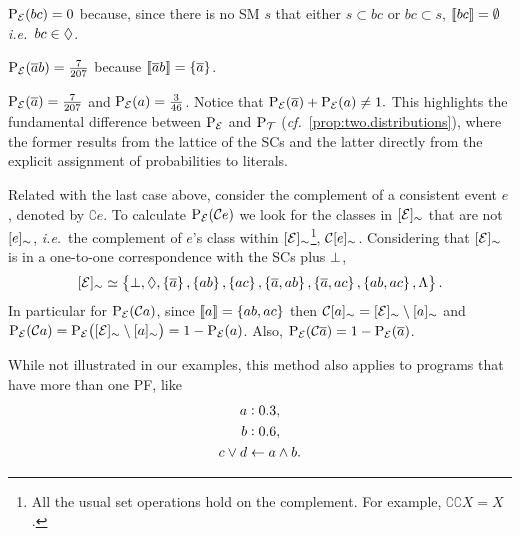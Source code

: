 \documentclass[x11names]{tlp}
\begin{document}
\begin{example}
\begin{description}
		\item $\prE\at{bc} = 0$ because, since there is no \ac{SM} $s$ that either $s \subset bc$ or $bc \subset s$, $\left\llbracket bc \right\rrbracket = \emptyset$ \emph{i.e.}\ $bc \in \Diamond$.

		\item $\prE\at{\co{a}b} = \frac{7}{207}$ because $\left\llbracket \overline{a}b \right\rrbracket = \set{\ensuremath{\overline{a}}}$.

		\item $\prE\at{\co{a}} = \frac{7}{207}$ and  $\prE\at{a} = \frac{3}{46}$. Notice that
		      $ \prE\at{\co{a}} + \prE\at{a} \not= 1. $
		      This highlights the fundamental difference between $\prE$ and $\prT$ (\emph{cf.~}\cref{prop:two.distributions}), where the former results from the lattice of the \aclp{SC} and the latter directly from the explicit assignment of probabilities to literals.
	\end{description}

	Related with the last case above, consider the complement of a consistent
	event $e$, denoted by $\complement e$. To calculate $\prE\at{\complement e}$
	we look for the classes in $\class{\EVENTSset}$ that are not $[{e}]_{\sim}$, \textit{i.e.}~the complement of $e$'s class within
	$\class{\EVENTSset}$\footnote{All the usual set operations hold on the
		complement. For example, $\complement\complement X = X$.},
	$\mathcal{C}[{e}]_{\sim}$. Considering that $\class{\EVENTSset}$ is in a
	one-to-one correspondence with the \aclp{SC} plus $\bot$, 
	\begin{equation*}
		\class{\EVENTSset} \simeq \set{
			\inconsistent, \indepclass, \set{\co{a}}
			, \set{ab}, \set{ac}, \set{\co{a}, ab}
			, \set{\co{a}, ac}, \set{ab, ac}, \consequenceclass}.
	\end{equation*}
	In particular for $\prE\at{\complement a}$, since $\left\llbracket a \right\rrbracket = \set{ab, ac}$ then $\complement \class{a} = \class{\EVENTSset} \setminus \class{a}$ and
	\(
	\prE\at{\complement a} =  \prE\at{\class{\EVENTSset} \setminus \class{a}} = 1 - \prE\at{a}
	\).
	Also, $\prE\at{\complement \co{a}} =  1 - \prE\at{\co{a}} $.
\end{example}

While not illustrated in our examples, this method also applies to programs
that have more than one \acl{PF}, like
\begin{equation*}
	\begin{aligned}
		\probfact{a & }{0.3},             %
		\\
		\probfact{b & }{0.6},             %
		\\
		c \vee d    & \clause a \wedge b.
	\end{aligned}
\end{equation*}
\end{document}
